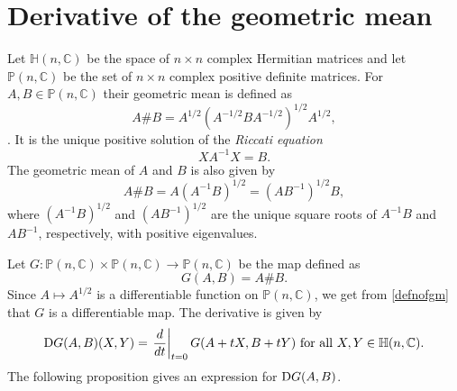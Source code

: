 \documentclass[12pt,epsfig,reqno]{amsart}
\newcommand{\C}{\mathbb{C}}
\newcommand{\De}{{\rm D}}
\theoremstyle{remark}
\begin{document}
\section{Derivative of the geometric mean}
Let $\mathbb H(n,\C)$ be the space of $n\times n$ complex Hermitian matrices and  let $\mathbb P(n,\C)$ be the set of $n\times n$ complex positive definite matrices.
For $A,B\in \mathbb P(n,\C)$ their  geometric mean is defined as
\begin{equation}
A\#B=A^{1/2} \left(A^{-1/2} B A^{-1/2}\right)^{1/2} A^{1/2},\label{defnofgm}
\end{equation}
\cite[Chapter 4]{bhatia_positive_definite}. It is the unique positive solution of the \emph{Riccati equation}
 \begin{equation}
XA^{-1} X=B.\label{equationofgm}
\end{equation}
The geometric mean of $A$ and $B$ is also given by
\begin{equation}
A\#B=A (A^{-1} B)^{1/2}=(AB^{-1})^{1/2} B,\label{gm}
\end{equation}
where $(A^{-1}B)^{1/2}$ and $(AB^{-1})^{1/2} $ are the unique square roots of $A^{-1}B$ and $AB^{-1}$, respectively, with positive eigenvalues.

Let $G: \mathbb P(n, \C) \times \mathbb P(n, \C)\rightarrow \mathbb P(n,\C)$ be the map defined as
$$G(A,B)=A\# B.$$ Since $A\mapsto A^{1/2}$ is a differentiable function on $\mathbb P(n,\C)$, %
we get from \eqref{defnofgm} that $G$ is a differentiable map. The derivative  is given by
$$\De G(A,B)(X,Y)=\left.\frac{d}{dt}\right|_{t=0} G(A+tX, B+tY) \text{ for all } X,Y\in \mathbb H(n,\C).$$
The following proposition gives an expression for $\De G(A,B)$.
\end{document}
